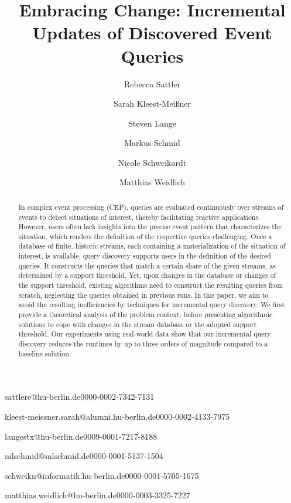 \documentclass[english]{lni}
\def\Snospace~{\S{}}
\newcommand\sectionautorefname{\Snospace}
\newcommand\subsectionautorefname{\Snospace}
\begin{document}
\def\Snospace~{\S{}}
\renewcommand\sectionautorefname{\Snospace}
\renewcommand\subsectionautorefname{\Snospace}


\title[Incremental Updates of Discovered Event Queries]{Embracing Change:
Incremental Updates of Discovered Event Queries}
 \author[1]{Rebecca Sattler}{sattlere@hu-berlin.de}{0000-0002-7342-7131}
 \author[1]{Sarah Kleest-Meißner}{kleest-meissner.sarah@alumni.hu-berlin.de}{0000-0002-4133-7975}
 \author[1]{Steven Lange}{langestx@hu-berlin.de}{0009-0001-7217-8188}
 \author[1]{Markus Schmid}{mlschmid@mlschmid.de}{0000-0001-5137-1504}%
 \author[1]{Nicole
 Schweikardt}{schweikn@informatik.hu-berlin.de}{0000-0001-5705-1675}%
 \author[1]{Matthias
 Weidlich}{matthias.weidlich@hu-berlin.de}{0000-0003-3325-7227}%


 \maketitle
\begin{abstract}
In complex event processing (CEP), queries are evaluated continuously over
streams of events to detect situations of interest, thereby
facilitating reactive applications.
However, users often lack insights into the precise event pattern that
characterizes the situation, which renders the
definition of the respective queries challenging.
Once a database of finite, historic
streams, each containing a materialization of the situation of interest, is
available, query discovery supports users in the
definition of the desired queries. It constructs the queries that match a
certain share of the given streams, as determined by a support
threshold. Yet, upon changes in the database or changes of the support
threshold, existing algorithms need to construct the resulting
queries from scratch, neglecting the queries obtained in previous runs.
In this paper, we aim to avoid the resulting inefficiencies by techniques
for incremental query discovery. We first provide a theoretical analysis of
the problem context, before presenting algorithmic solutions to cope with
changes in the stream database or the adopted support threshold.
Our experiments using real-world data show that our incremental query
discovery
reduces the runtimes by up to three orders of magnitude compared to a
baseline solution.
\end{abstract}
\end{document}
